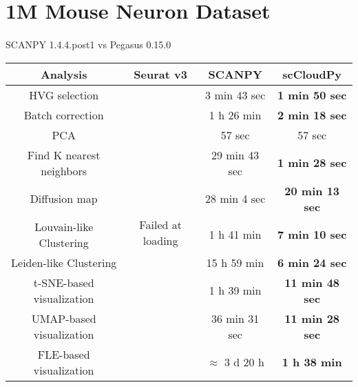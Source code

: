 \documentclass[10pt]{article}
\begin{document}
\section{1M Mouse Neuron Dataset}

\paragraph{}
SCANPY 1.4.4.post1 \qquad vs \qquad Pegasus 0.15.0

\begin{table}[H]
	\centering
	\begin{tabular}{|c|c|c|c|}
		\hline
		Analysis  & Seurat v3 & SCANPY & scCloudPy\\
		\hline \hline
		HVG selection  & \multirow{10}{*}{Failed at loading} & 3 min 43 sec  & \textbf{1 min 50 sec}  \\
		\cline{1-1}\cline{3-4}
		Batch correction  & & 1 h 26 min  & \textbf{2 min 18 sec}  \\
		\cline{1-1}\cline{3-4}
		PCA   & & 57 sec  & 57 sec  \\
		\cline{1-1}\cline{3-4}
		Find K nearest neighbors &  & 29 min 43 sec  & \textbf{1 min 28 sec}  \\
		\cline{1-1}\cline{3-4}
		Diffusion map   & & 28 min 4 sec  & \textbf{20 min 13 sec}  \\
		\cline{1-1}\cline{3-4}
		Louvain-like Clustering &  & 1 h 41 min  & \textbf{7 min 10 sec}  \\
		\cline{1-1}\cline{3-4}
		Leiden-like Clustering & & 15 h 59 min  & \textbf{6 min 24 sec}  \\
		\cline{1-1}\cline{3-4}
		t-SNE-based visualization  & & 1 h 39 min  & \textbf{11 min 48 sec}  \\
		\cline{1-1}\cline{3-4}
		UMAP-based visualization  & & 36 min 31 sec   & \textbf{11 min 28 sec}  \\
		\cline{1-1}\cline{3-4}
		FLE-based visualization   & & $\approx$ 3 d 20 h  & \textbf{1 h 38 min}  \\
		\hline
	\end{tabular}
\end{table}
\end{document}
